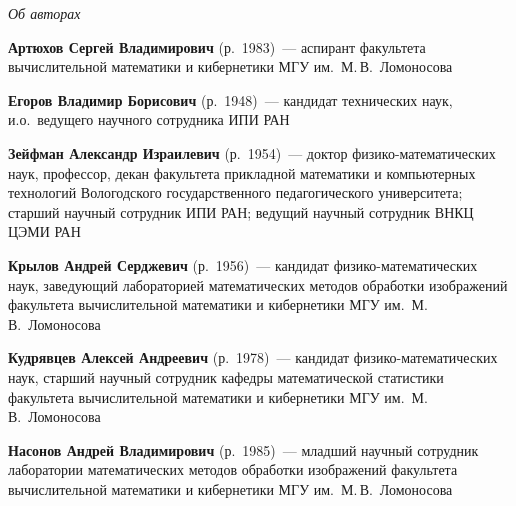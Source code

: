 



\vspace*{-48pt}
\begin{center}\LARGE
\textit{Об авторах}
\end{center}
\thispagestyle{empty}

\vspace*{36pt}

\begin{multicols}{2}

\noindent
\textbf{Артюхов Сергей Владимирович} (р.\ 1983)~--- аспирант факультета
вычислительной математики и кибернетики МГУ им.\ М.\,В.~Ломоносова

\vspace*{6pt}

\noindent %
\textbf{Егоров Владимир Борисович} (р.\ 1948)~---  кандидат технических наук,
и.о.\ ведущего научного сотрудника   ИПИ РАН

\vspace*{6pt}

\noindent
\textbf{Зейфман Александр Израилевич} (р.\ 1954)~--- доктор
физико-математических наук, профессор, декан факультета прикладной
математики и компьютерных технологий Вологодского государственного
педагогического университета; старший научный сотрудник ИПИ РАН;
ведущий научный сотрудник ВНКЦ ЦЭМИ РАН

\vspace*{6pt}

\noindent
\textbf{Крылов Андрей Серджевич} (р.\ 1956)~--- кандидат фи\-зи\-ко-математических наук,
заведующий лабораторией математических методов обработки изображений факультета вычислительной математики и кибернетики
МГУ им.~М.\,В.~Ломоносова

\vspace*{6pt}

\noindent
\textbf{Кудрявцев Алексей Андреевич} (р.\ 1978)~--- кандидат физико-математических наук,
старший научный сотрудник кафедры математической ста\-ти\-сти\-ки факультета вычислительной 
математики и\linebreak
 кибернетики МГУ им.\ М.\,В.~Ломоносова


\vspace*{6pt}

\noindent
\textbf{Насонов Андрей Владимирович} (р.\ 1985)~--- младший научный сотрудник лаборатории математических методов
обработки изображений факультета вы\-чис\-ли\-тельной математики и кибернетики
МГУ им.\ М.\,В.~Ломоносова


\end{multicols}
